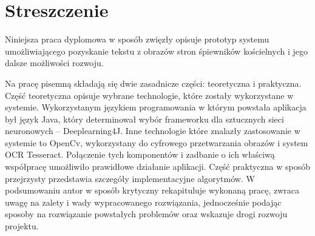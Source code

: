 \documentclass[a4paper,12pt]{article}
\newcommand\spacingIndent{2.2em}
\begin{document}
	\setcounter{page}{2}
	\begin{spacing}{1.4}
	    \noindent\begin{minipage}[s]{\textwidth}
            \tableofcontents
        \end{minipage}
    \end{spacing}
	\newpage 
	
    \section*{Streszczenie}
	     \hspace{\spacingIndent} Niniejsza praca dyplomowa w sposób            zwięzły opisuje prototyp systemu umożliwiającego       pozyskanie tekstu z obrazów stron śpiewników kościelnych i     jego dalsze możliwości rozwoju. 
	     
         Na pracę pisemną składają się dwie zasadnicze części:        teoretyczna i praktyczna. Część teoretyczna opisuje           wybrane technologie, które zostały wykorzystane w             systemie. Wykorzystanym językiem programowania w którym powstała aplikacja był język Java, który determinował wybór frameworku dla sztucznych sieci neuronowych -- Deeplearning4J. Inne technologie które znalazły zastosowanie w systemie to OpenCv, wykorzystany do cyfrowego przetwarzania obrazów i system OCR Tesseract. Połączenie tych komponentów i zadbanie o ich właściwą współpracę umożliwiło prawidłowe działanie aplikacji. Część praktyczna w sposób przejrzysty           przedstawia szczegóły implementacyjne algorytmów. W podsumowaniu        autor w sposób krytyczny rekapituluje wykonaną pracę,          zwraca uwagę na zalety i wady wypracowanego                rozwiązania, jednocześnie podając sposoby na rozwiązanie      powstałych problemów oraz wskazuje drogi           rozwoju projektu.   
\end{document}
